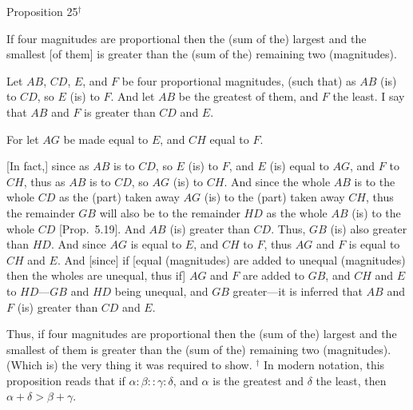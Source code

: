 
\begin{center}
{\large Proposition 25}$^\dag$
\end{center}

If four magnitudes are proportional then the (sum of the)
largest  and the smallest [of them] is greater than the (sum of the)  remaining two (magnitudes).

\epsfysize=1.4in
\centerline{}

Let $AB$, $CD$, $E$, and $F$ be four proportional magnitudes, (such that) as
$AB$ (is) to $CD$, so $E$ (is) to $F$. And let $AB$ be the greatest of them, and $F$ the least. I say that $AB$ and $F$ is greater than $CD$ and $E$.

For let $AG$ be made equal to $E$, and $CH$ equal to $F$.

\mbox{[}In fact,] since as $AB$ is to $CD$, so $E$ (is) to $F$, and $E$ (is) equal to $AG$, and
$F$ to $CH$,  thus as $AB$ is to $CD$, so $AG$ (is) to $CH$. And since the whole
$AB$ is to the whole $CD$ as the (part) taken away $AG$ (is) to the
(part) taken away $CH$, thus the remainder $GB$ will also be to the
remainder $HD$ as the whole $AB$ (is) to the whole $CD$ [Prop.~5.19]. And $AB$ (is) greater than $CD$.
Thus, $GB$ (is) also greater than $HD$. And since $AG$ is equal to $E$, and $CH$
to $F$, thus $AG$ and $F$ is equal to $CH$ and $E$. And [since] if [equal (magnitudes)
are added to unequal (magnitudes) then the wholes are unequal, thus if] $AG$ and $F$ are added to $GB$, and $CH$ and
$E$ to $HD$---$GB$ and
$HD$ being unequal, and $GB$ greater---it is inferred that $AB$ and $F$ (is) greater than $CD$ and $E$.

Thus, if four magnitudes are proportional then the (sum of the)
largest  and the smallest of them is greater than the (sum of the) remaining two (magnitudes). (Which is) the very thing it was required to show.
{\footnotesize \noindent$^\dag$ In modern notation, this proposition
reads that if $\alpha:\beta::\gamma:\delta$, and $\alpha$ is the greatest and $\delta$ the least, then $\alpha+\delta>\beta+\gamma$.}
